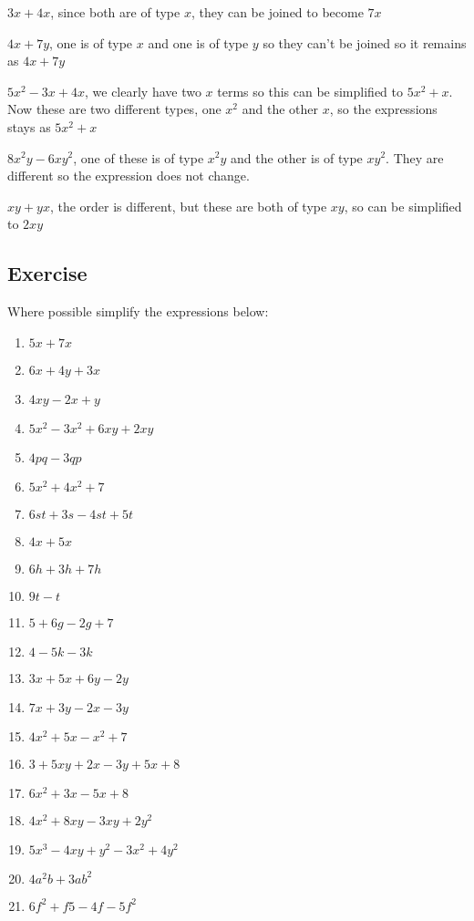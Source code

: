 \begin{exmp}
$3x+4x$, since both are of type $x$, they can be joined to become $7x$
\end{exmp}
\begin{exmp}
$4x + 7y$, one is of type $x$ and one is of type $y$ so they can't be joined so it remains as $4x+7y$
\end{exmp}
\begin{exmp}
$5x^2 - 3x + 4x$, we clearly have two $x$ terms so this can be simplified to $5x^2+x$.  Now these are two different types, one $x^2$ and the other $x$, so the expressions stays as $5x^2+x$
\end{exmp}
\begin{exmp}
$8x^2y - 6xy^2$, one of these is of type $x^2y$ and the other is of type $xy^2$.  They are different so the expression does not change.
\end{exmp}
\begin{exmp}
$xy + yx$, the order is different, but these are both of type $xy$, so can be simplified to $2xy$
\end{exmp}

\subsection{Exercise}
Where possible simplify the expressions below:
\begin{enumerate}
	\item $5x+7x$
	\item $6x+4y + 3x$
	\item $4xy - 2x + y$
	\item $5x^2-3x^2+6xy+2xy$
	\item $4pq-3qp$
	\item $5x^2+4x^2+7$
	\item $6st+3s-4st+5t$
	\item $4x+5x$
	\item $6h+3h+7h$
	\item $9t-t$
	\item $5+6g-2g+7$
	\item $4-5k-3k$
	\item $3x+5x+6y-2y$
	\item $7x+3y-2x-3y$
	\item $4x^2+5x-x^2+7$
	\item $3+5xy+2x-3y+5x+8$
	\item $6x^2+3x-5x+8$
	\item $4x^2+8xy-3xy+2y^2$
	\item $5x^3-4xy+y^2-3x^2+4y^2$
	\item $4a^2b+3ab^2$
	\item $6f^2+f5-4f-5f^2$
\end{enumerate}
